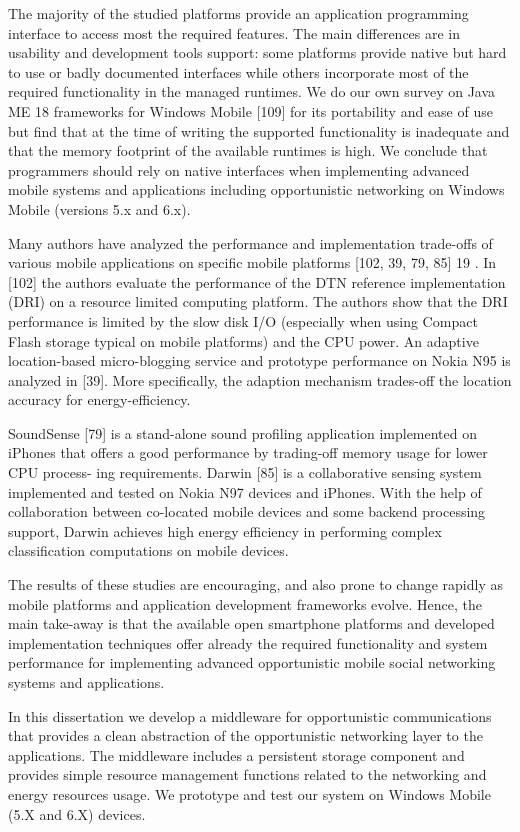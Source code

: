 The majority of the studied platforms provide an application programming interface to access most the required features. The main differences are in usability and
development tools support: some platforms provide native but hard to use or badly documented interfaces while others incorporate most of the required functionality in
the managed runtimes. We do our own survey on Java ME 18 frameworks for Windows Mobile [109] for its portability and ease of use but find that at the time of writing
the supported functionality is inadequate and that the memory footprint of the available runtimes is high. We conclude that programmers should rely on native interfaces
when implementing advanced mobile systems and applications including opportunistic networking on Windows Mobile (versions 5.x and 6.x).

Many authors have analyzed the performance and implementation trade-offs of various mobile applications on specific mobile platforms [102, 39, 79, 85] 19 . In [102]
the authors evaluate the performance of the DTN reference implementation (DRI) on a resource limited computing platform. The authors show that the DRI performance is 
limited by the slow disk I/O (especially when using Compact Flash storage typical on mobile platforms) and the CPU power. An adaptive location-based micro-blogging
service and prototype performance on Nokia N95 is analyzed in [39]. More specifically, the adaption mechanism trades-off the location accuracy for energy-efficiency.

SoundSense [79] is a stand-alone sound profiling application implemented on iPhones that offers a good performance by trading-off memory usage for lower CPU process-
ing requirements. Darwin [85] is a collaborative sensing system implemented and tested on Nokia N97 devices and iPhones. With the help of collaboration between
co-located mobile devices and some backend processing support, Darwin achieves high energy efficiency in performing complex classification computations on mobile
devices.

The results of these studies are encouraging, and also prone to change rapidly as mobile platforms and application development frameworks evolve. Hence, the main
take-away is that the available open smartphone platforms and developed implementation techniques offer already the required functionality and system performance for
implementing advanced opportunistic mobile social networking systems and applications.

In this dissertation we develop a middleware for opportunistic communications that provides a clean abstraction of the opportunistic networking layer to the 
applications. The middleware includes a persistent storage component and provides simple resource management functions related to the networking and energy resources 
usage. We prototype and test our system on Windows Mobile (5.X and 6.X) devices.

